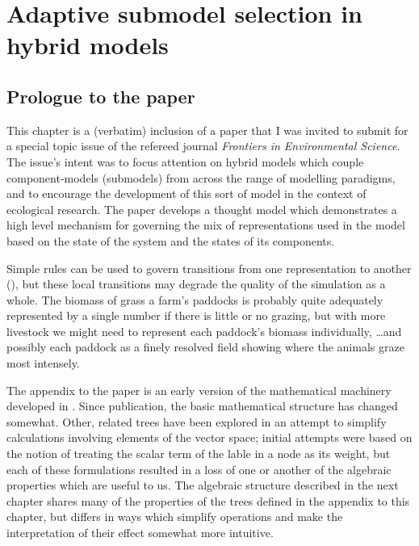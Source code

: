 
\chapter[ADAPTIVE SUBMODEL SELECTION IN HYBRID MODELS]{Adaptive submodel selection in hybrid  models}\label{adaptiveselection}

\WeAreOn{\cthree}
\section{Prologue to the paper}  
This chapter is a (verbatim) inclusion of a paper that I was invited
to submit for a special topic issue of the refereed journal
\emph{Frontiers in Environmental Science}. The issue's intent was to
focus attention on hybrid models which couple component-models
(submodels) from across the range of modelling paradigms, and to
encourage the development of this sort of model in the context of
ecological research.  The paper develops a thought model which
demonstrates a high level mechanism for governing the mix of
representations used in the model based on the state of the system and
the states of its components.

Simple rules can be used to govern transitions from one representation
to another (\Ctwo), but these local transitions may degrade the
quality of the simulation as a whole. The biomass of grass a farm's
paddocks is probably quite adequately represented by a single number
if there is little or no grazing, but with more livestock we might
need to represent each paddock's biomass individually, \ldots and
possibly each paddock as a finely resolved field showing where the
animals graze most intensely.

The appendix to the paper is an early version of the mathematical
machinery developed in \Cfour. Since publication, the basic
mathematical structure has changed somewhat.  Other, related trees
have been explored in an attempt to simplify calculations involving
elements of the vector space; initial attempts were based on the
notion of treating the scalar term of the lable in a node as its
weight, but each of these formulations resulted in a loss of one or
another of the algebraic properties which are useful to us. The
algebraic structure described in the next chapter shares many of the
properties of the trees defined in the appendix to this chapter, but
differs in ways which simplify operations and make the interpretation
of their effect somewhat more intuitive.

